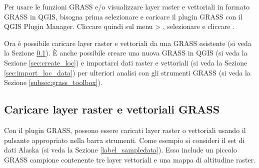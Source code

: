 Per usare le funzioni GRASS e/o visualizzare layer raster e vettoriali in
formato GRASS in QGIS, bisogna prima selezionare e caricare il plugin GRASS con il
QGIS Plugin Manager. 
Cliccare quindi sul menu  > , 
selezionare  e cliccare . 

Ora è possibile caricare layer raster e vettoriali da una 
GRASS esistente (si veda la Sezione \ref{sec:load_grassdata}). È anche
possibile creare una nuova  GRASS in QGIS (si veda la
Sezione \ref{sec:create_loc}) e importarci dati raster e vettoriali (si
veda la Sezione \ref{sec:import_loc_data}) per ulteriori analisi con gli
strumenti GRASS (si veda la Sezione \ref{subsec:grass_toolbox}).

\subsection{Caricare layer raster e vettoriali GRASS}\label{sec:load_grassdata}

Con il plugin GRASS, possono essere caricati layer raster o vettoriali
usando il pulsante appropriato nella barra strumenti. Come esempio si
consideri il set di dati Alaska (si veda la Sezione \ref{label_sampledata}).
Esso include un piccolo  GRASS campione contenente tre layer
vettoriali e una mappa di altitudine raster.

